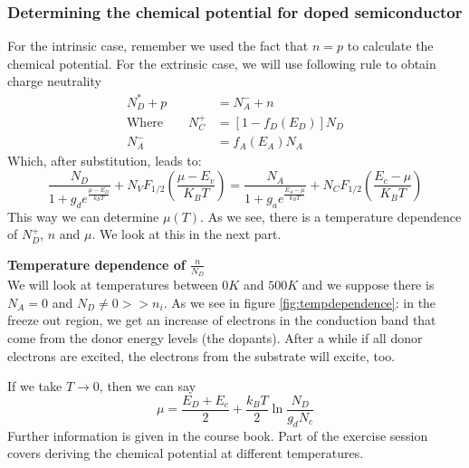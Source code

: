 \subsubsection{Determining the chemical potential for doped semiconductor}
For the intrinsic case, remember we used the fact that $n = p$ to calculate the chemical potential. For the extrinsic case, we will use following rule to obtain charge neutrality
\begin{align}
	N_D^* + p &= N_A^- + n \\
	\text{Where}\qquad N_C^+ &= \left[1 - f_D(E_D)\right]N_D \nonumber \\
	N_A^- &= f_A(E_A)N_A \nonumber
\end{align}
Which, after substitution, leads to:
\begin{equation}
	\frac{N_D}{1+g_de^{\frac{\mu - E_D}{k_BT}}} + N_VF_{1/2}\left(\frac{\mu - E_v}{K_BT}\right) = \frac{N_A}{1+g_ae^{\frac{E_A-\mu}{k_BT}}} + N_CF_{1/2}\left(\frac{E_c - \mu}{K_BT}\right)
\end{equation}
This way we can determine $\mu(T)$. As we see, there is a temperature dependence of $N_D^+$, $n$ and $\mu$. We look at this in the next part.\\ \par
\textbf{Temperature dependence of $\frac{n}{N_D}$}\\
We will look at temperatures between $0K$ and $500K$ and we suppose there is $N_A = 0$ and $N_D \neq 0 >> n_i$. As we see in figure \ref{fig:tempdependence}: in the freeze out region, we get an increase of electrons in the conduction band that come from the donor energy levels (the dopants). After a while if all donor electrons are excited, the electrons from the substrate will excite, too. \\ \par
If we take $T \rightarrow 0$, then we can say
\begin{equation}
	\mu = \frac{E_D + E_c}{2} + \frac{k_BT}{2}\ln\frac{N_D}{g_dN_c}
\end{equation}
Further information is given in the course book. Part of the exercise session covers deriving the chemical potential at different temperatures.
